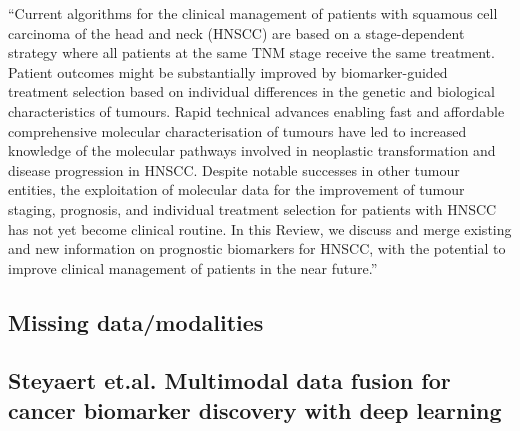 \documentclass{article}%
\begin{document}
%
“Current algorithms for the clinical management of patients with squamous cell carcinoma of the head and neck (HNSCC) are based on a stage{-}dependent strategy where all patients at the same TNM stage receive the same treatment. Patient outcomes might be substantially improved by biomarker{-}guided treatment selection based on individual differences in the genetic and biological characteristics of tumours. Rapid technical advances enabling fast and affordable comprehensive molecular characterisation of tumours have led to increased knowledge of the molecular pathways involved in neoplastic transformation and disease progression in HNSCC. Despite notable successes in other tumour entities, the exploitation of molecular data for the improvement of tumour staging, prognosis, and individual treatment selection for patients with HNSCC has not yet become clinical routine. In this  Review, we discuss and merge existing and new information on prognostic biomarkers for HNSCC, with the potential to improve clinical management of patients in the near future.”%
\newline%
\newline%
%
\subsection{Missing data/modalities }%
\label{subsec:Missingdata/modalities}%

%
%
\newline%
\newline%
%
\subsection{Steyaert et.al. Multimodal data fusion for cancer biomarker discovery with deep learning }%
\label{subsec:Steyaertet.al.Multimodaldatafusionforcancerbiomarkerdiscoverywithdeeplearning}%
\end{document}

